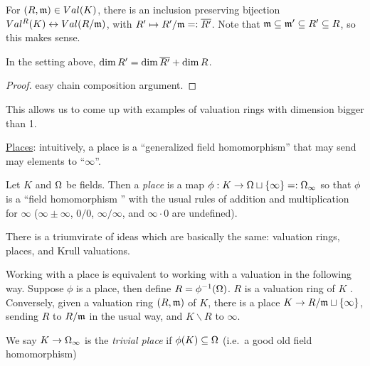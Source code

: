  \begin{theorem}[4.13]
   For $(R,\mathfrak{m})\in Val(K)$, there is an inclusion preserving bijection
   $Val^R(K)\leftrightarrow Val(R/\mathfrak{m})$, with $R'\mapsto R'/\mathfrak{m} =: \overline{R'}$. Note that
   $\mathfrak{m}\subseteq \mathfrak{m}'\subseteq R'\subseteq R$, so this makes sense.
 \end{theorem}
 \begin{corollary}
   In the setting above, $\dim R' = \dim \overline{R'} + \dim R$.
 \end{corollary}
 \begin{proof}
   easy chain composition argument.
 \end{proof}
 This allows us to come up with examples of valuation rings with dimension bigger than 1.

 \underline{Places}: intuitively, a place is a ``generalized field homomorphism'' that
 may send may elements to ``$\infty$''.
 \begin{definition}
   Let $K$ and $\Omega$ be fields. Then a \emph{place} is a map $\phi:K\to \Omega\sqcup
   \{\infty\} =: \Omega_\infty$ so that $\phi$ is a ``field homomorphism '' with the usual
   rules of addition and multiplication for $\infty$ ($\infty \pm \infty$, $0/0$,
   $\infty/\infty$, and $\infty\cdot 0$ are undefined).
 \end{definition}
 There is a triumvirate of ideas which are basically the same: valuation rings, places,
 and Krull valuations.

 Working with a place is equivalent to working with a valuation in the following way.
 Suppose $\phi$ is a place, then define $R=\phi^{-1}(\Omega)$. $R$ is a valuation ring of $K$
 \anton{}. Conversely, given a valuation ring $(R,\mathfrak{m})$ of $K$, there is a place $K\to
 R/\mathfrak{m} \sqcup \{\infty\}$, sending $R$ to $R/\mathfrak{m}$ in the usual way, and $K\smallsetminus R$
 to $\infty$.

 We say $K\to \Omega_\infty$ is the \emph{trivial place} if $\phi(K)\subseteq \Omega$ (i.e.~a
 good old field homomorphism)
